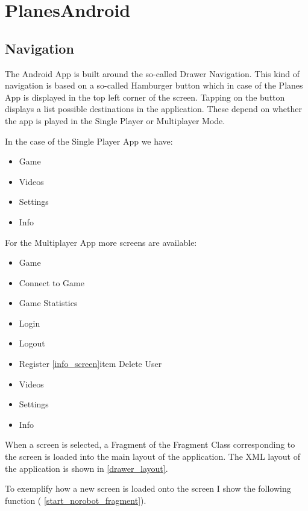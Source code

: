 \section{ PlanesAndroid }

\subsection { Navigation }

The Android App is built around the so-called Drawer Navigation. This kind of navigation is based on a so-called Hamburger button which in case of the Planes App is displayed in the top left corner of the screen. Tapping on the button displays a list possible destinations in the application. These depend on whether the app is played in the Single Player or Multiplayer Mode. 

In the case of the Single Player App we have:
\begin{itemize}
\item Game
\item Videos
\item Settings
\item Info
\end{itemize}

For the Multiplayer App more screens are available:

\begin{itemize}
	\item Game
	\item Connect to Game
	\item Game Statistics
	\item Login
	\item Logout
	\item Register
	\ref{info_screen}item Delete User
	\item Videos
	\item Settings
	\item Info
\end{itemize}

When a screen is selected, a Fragment of the Fragment Class corresponding to the screen is loaded into the main layout of the application. The XML layout of the application is shown in \ref{drawer_layout}.

To exemplify how a new screen is loaded onto the screen I show the following function ( \ref{start_norobot_fragment}).

